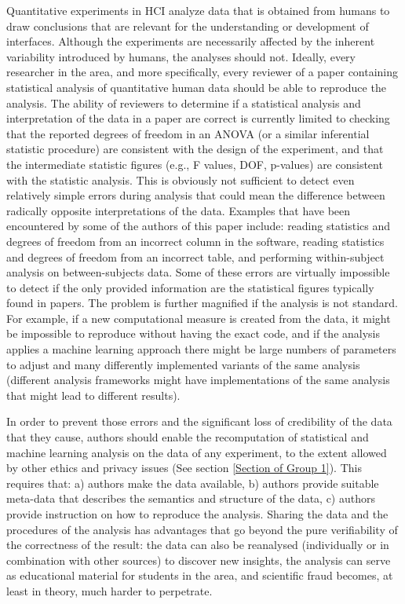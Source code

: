 Quantitative experiments in HCI analyze data that is obtained from humans to draw conclusions that are relevant for the understanding or development of interfaces. Although the experiments are necessarily affected by the inherent variability introduced by humans, the analyses should not. Ideally, every researcher in the area, and more specifically, every reviewer of a paper containing statistical analysis of quantitative human data should be able to reproduce the analysis. The ability of reviewers to determine if a statistical analysis and interpretation of the data in a paper are correct is currently limited to checking that the reported degrees of freedom in an ANOVA (or a similar inferential statistic procedure) are consistent with the design of the experiment, and that the intermediate statistic figures (e.g., F values, DOF, p-values) are consistent with the statistic analysis. This is obviously not sufficient to detect even relatively simple errors during analysis that could mean the difference between radically opposite interpretations of the data. Examples that have been encountered by some of the authors of this paper include: reading statistics and degrees of freedom from an incorrect column in the software, reading statistics and degrees of freedom from an incorrect table, and performing within-subject analysis on between-subjects data. Some of these errors are virtually impossible to detect if the only provided information are the statistical figures typically found in papers. The problem is further magnified if the analysis is not standard. For example, if a new computational measure is created from the data, it might be impossible to reproduce without having the exact code, and if the analysis applies a machine learning approach there might be large numbers of parameters to adjust and many differently implemented variants of the same analysis (different analysis frameworks might have implementations of the same analysis that might lead to different results).

In order to prevent those errors and the significant loss of credibility of the data that they cause, authors should enable the recomputation of statistical and machine learning analysis on the data of any experiment, to the extent allowed by other ethics and privacy issues (See section \ref{Section of Group 1}). This requires that: a) authors make the data available, b) authors provide suitable meta-data that describes the semantics and structure of the data, c) authors provide instruction on how to reproduce the analysis. Sharing the data and the procedures of the analysis has advantages that go beyond the pure verifiability of the correctness of the result: the data can also be reanalysed (individually or in combination with other sources) to discover new insights, the analysis can serve as educational material for students in the area, and scientific fraud becomes, at least in theory, much harder to perpetrate. 

